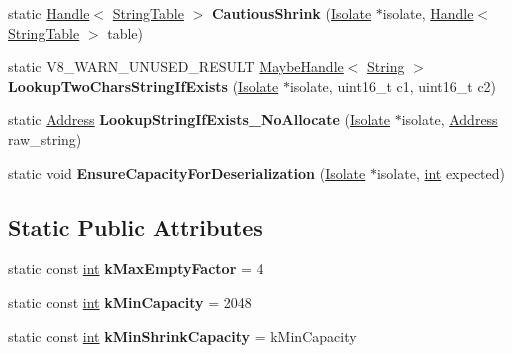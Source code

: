 \begin{DoxyCompactItemize}
static \mbox{\hyperlink{classv8_1_1internal_1_1Handle}{Handle}}$<$ \mbox{\hyperlink{classv8_1_1internal_1_1StringTable}{String\+Table}} $>$ {\bfseries Cautious\+Shrink} (\mbox{\hyperlink{classv8_1_1internal_1_1Isolate}{Isolate}} $\ast$isolate, \mbox{\hyperlink{classv8_1_1internal_1_1Handle}{Handle}}$<$ \mbox{\hyperlink{classv8_1_1internal_1_1StringTable}{String\+Table}} $>$ table)
\item 
\mbox{\label{classv8_1_1internal_1_1StringTable_af4c75301d2ce7b54118523a1b0764b1f}} 
static V8\+\_\+\+W\+A\+R\+N\+\_\+\+U\+N\+U\+S\+E\+D\+\_\+\+R\+E\+S\+U\+LT \mbox{\hyperlink{classv8_1_1internal_1_1MaybeHandle}{Maybe\+Handle}}$<$ \mbox{\hyperlink{classv8_1_1internal_1_1String}{String}} $>$ {\bfseries Lookup\+Two\+Chars\+String\+If\+Exists} (\mbox{\hyperlink{classv8_1_1internal_1_1Isolate}{Isolate}} $\ast$isolate, uint16\+\_\+t c1, uint16\+\_\+t c2)
\item 
\mbox{\label{classv8_1_1internal_1_1StringTable_a2d8861360a8d7a5d67860364667fdba2}} 
static \mbox{\hyperlink{classuintptr__t}{Address}} {\bfseries Lookup\+String\+If\+Exists\+\_\+\+No\+Allocate} (\mbox{\hyperlink{classv8_1_1internal_1_1Isolate}{Isolate}} $\ast$isolate, \mbox{\hyperlink{classuintptr__t}{Address}} raw\+\_\+string)
\item 
\mbox{\label{classv8_1_1internal_1_1StringTable_af642d2cd7ddd164366c1935d91916028}} 
static void {\bfseries Ensure\+Capacity\+For\+Deserialization} (\mbox{\hyperlink{classv8_1_1internal_1_1Isolate}{Isolate}} $\ast$isolate, \mbox{\hyperlink{classint}{int}} expected)
\end{DoxyCompactItemize}
\subsection*{Static Public Attributes}
\begin{DoxyCompactItemize}
\item 
\mbox{\label{classv8_1_1internal_1_1StringTable_a387839569febea92bf39c483c2719e73}} 
static const \mbox{\hyperlink{classint}{int}} {\bfseries k\+Max\+Empty\+Factor} = 4
\item 
\mbox{\label{classv8_1_1internal_1_1StringTable_a97892e1db80079c6c386643c7cd8a33b}} 
static const \mbox{\hyperlink{classint}{int}} {\bfseries k\+Min\+Capacity} = 2048
\item 
\mbox{\label{classv8_1_1internal_1_1StringTable_a716917a7d96987abfb821c83eee25b36}} 
static const \mbox{\hyperlink{classint}{int}} {\bfseries k\+Min\+Shrink\+Capacity} = k\+Min\+Capacity
\end{DoxyCompactItemize}
